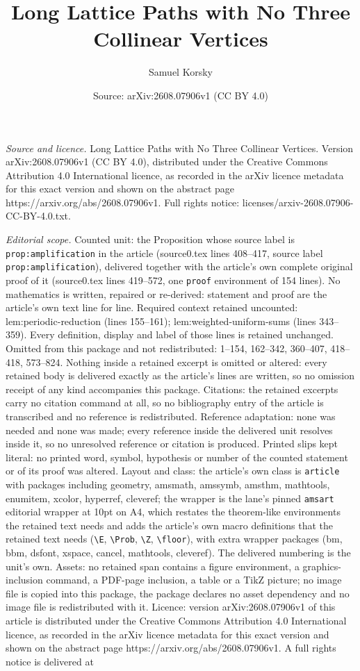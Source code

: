 \documentclass[10pt,a4paper]{amsart}
\title[Long Lattice Paths with No Three Collinear Vertices]{Long Lattice Paths with No Three Collinear Vertices}
\author{Samuel Korsky}
\date{Source: arXiv:2608.07906v1 (CC BY 4.0)}
\begin{document}
\maketitle

\noindent\emph{Source and licence.} Long Lattice Paths with No Three Collinear Vertices. Version arXiv:2608.07906v1 (CC BY 4.0), distributed under the Creative Commons Attribution 4.0 International licence, as recorded in the arXiv licence metadata for this exact version and shown on the abstract page https://arxiv.org/abs/2608.07906v1. Full rights notice: licenses/arxiv-2608.07906-CC-BY-4.0.txt.\par\smallskip

\noindent\textit{Editorial scope.} Counted unit: the Proposition whose source label is \texttt{prop:amplification} in the article (source0.tex lines 408--417, source label \texttt{prop:amplification}), delivered together with the article's own complete original proof of it (source0.tex lines 419--572, one \texttt{proof} environment of 154 lines). No mathematics is written, repaired or re-derived: statement and proof are the article's own text line for line. Required context retained uncounted: lem:periodic-reduction (lines 155--161); lem:weighted-uniform-sums (lines 343--359). Every definition, display and label of those lines is retained unchanged. Omitted from this package and not redistributed: 1--154, 162--342, 360--407, 418--418, 573--824. Nothing inside a retained excerpt is omitted or altered: every retained body is delivered exactly as the article's lines are written, so no omission receipt of any kind accompanies this package. Citations: the retained excerpts carry no citation command at all, so no bibliography entry of the article is transcribed and no reference is redistributed. Reference adaptation: none was needed and none was made; every reference inside the delivered unit resolves inside it, so no unresolved reference or citation is produced. Printed slips kept literal: no printed word, symbol, hypothesis or number of the counted statement or of its proof was altered. Layout and class: the article's own class is \texttt{article} with packages including geometry, amsmath, amssymb, amsthm, mathtools, enumitem, xcolor, hyperref, cleveref; the wrapper is the lane's pinned \texttt{amsart} editorial wrapper at 10pt on A4, which restates the theorem-like environments the retained text needs and adds the article's own macro definitions that the retained text needs (\texttt{\textbackslash E}, \texttt{\textbackslash Prob}, \texttt{\textbackslash Z}, \texttt{\textbackslash floor}), with extra wrapper packages (bm, bbm, dsfont, xspace, cancel, mathtools, cleveref). The delivered numbering is the unit's own. Assets: no retained span contains a figure environment, a graphics-inclusion command, a PDF-page inclusion, a table or a TikZ picture; no image file is copied into this package, the package declares no asset dependency and no image file is redistributed with it. Licence: version arXiv:2608.07906v1 of this article is distributed under the Creative Commons Attribution 4.0 International licence, as recorded in the arXiv licence metadata for this exact version and shown on the abstract page https://arxiv.org/abs/2608.07906v1. A full rights notice is delivered at 
\end{document}
